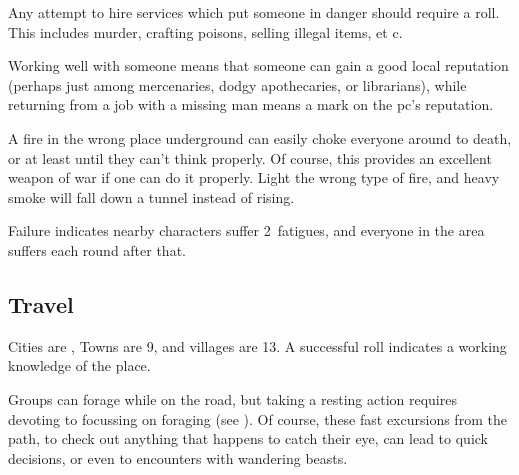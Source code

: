 \begin{multicols}{2}

Any attempt to hire services which put someone in danger should require a roll.
This includes murder, crafting poisons, selling illegal items, et c.

Working well with someone means that someone can gain a good local reputation (perhaps just among mercenaries, dodgy apothecaries, or librarians), while returning from a job with a missing man means a mark on the \gls{pc}'s reputation.

A fire in the wrong place underground can easily choke everyone around to death, or at least until they can't think properly.
Of course, this provides an excellent weapon of war if one can do it properly.
Light the wrong type of fire, and heavy smoke will fall down a tunnel instead of rising.

Failure indicates nearby characters suffer 2~\glspl{fatigue}, and everyone in the area suffers  each round after that.

\subsection{Travel}

Cities are \tn[7], Towns are 9, and \glspl{village} are 13.
A successful roll indicates a working knowledge of the place.



Groups can forage while on the road, but taking a resting action requires devoting  to focussing on foraging (see ).
Of course, these fast excursions from the path, to check out anything that happens to catch their eye, can lead to quick decisions, or even to encounters with wandering beasts.


\end{multicols}
